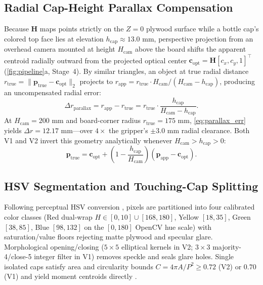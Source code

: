 \documentclass[10pt,twocolumn,letterpaper]{article}
\begin{document}
\subsection{Radial Cap-Height Parallax Compensation}
Because $\mathbf{H}$ maps points strictly on the $Z=0$ plywood surface while a bottle cap's colored top face lies at elevation $h_{\mathrm{cap}} \approx 13.0\text{ mm}$, perspective projection from an overhead camera mounted at height $H_{\mathrm{cam}}$ above the board shifts the apparent centroid radially outward from the projected optical center $\mathbf{c}_{\mathrm{opt}} = \mathbf{H}[c_x, c_y, 1]^\top$ (\cref{fig:pipeline}a, Stage~4). By similar triangles, an object at true radial distance $r_{\mathrm{true}} = \|\mathbf{p}_{\mathrm{true}} - \mathbf{c}_{\mathrm{opt}}\|_2$ projects to $r_{\mathrm{app}} = r_{\mathrm{true}} \cdot H_{\mathrm{cam}} / (H_{\mathrm{cam}} - h_{\mathrm{cap}})$, producing an uncompensated radial error:
\begin{equation}
  \Delta r_{\mathrm{parallax}} = r_{\mathrm{app}} - r_{\mathrm{true}} = r_{\mathrm{true}} \cdot \frac{h_{\mathrm{cap}}}{H_{\mathrm{cam}} - h_{\mathrm{cap}}}.
  \label{eq:parallax_err}
\end{equation}
At $H_{\mathrm{cam}}=200\text{ mm}$ and board-corner radius $r_{\mathrm{true}}=175\text{ mm}$, \cref{eq:parallax_err} yields $\Delta r = 12.17\text{ mm}$—over $4\times$ the gripper's $\pm 3.0\text{ mm}$ radial clearance. Both V1 and V2 invert this geometry analytically whenever $H_{\mathrm{cam}} > h_{\mathrm{cap}} > 0$:
\begin{equation}
  \mathbf{p}_{\mathrm{true}} = \mathbf{c}_{\mathrm{opt}} + \left(1 - \frac{h_{\mathrm{cap}}}{H_{\mathrm{cam}}}\right)\!\left(\mathbf{p}_{\mathrm{app}} - \mathbf{c}_{\mathrm{opt}}\right).
  \label{eq:parallax_comp}
\end{equation}

\subsection{HSV Segmentation and Touching-Cap Splitting}
Following perceptual HSV conversion \cite{smith1978color}, pixels are partitioned into four calibrated color classes (Red dual-wrap $H\in[0,10]\cup[168,180]$, Yellow $[18,35]$, Green $[38,85]$, Blue $[98,132]$ on the $[0,180]$ OpenCV hue scale) with saturation/value floors rejecting matte plywood and specular glare. Morphological opening/closing ($5\times 5$ elliptical kernels in V2; $3\times 3$ majority-4/close-5 integer filter in V1) removes speckle and seals glare holes. Single isolated caps satisfy area and circularity bounds $C = 4\pi A / P^2 \ge 0.72$ (V2) or $0.70$ (V1) and yield moment centroids directly \cite{suzuki1985topological}.
\end{document}

